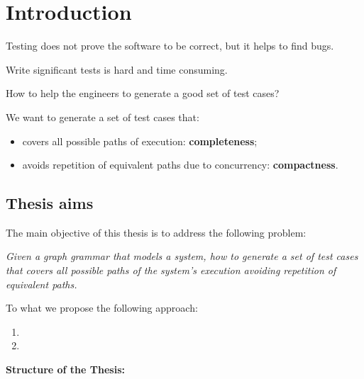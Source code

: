 \chapter{Introduction}

Testing does not prove the software to be correct, but it helps to find bugs.

Write significant tests is hard and time consuming.

How to help the engineers to generate a good set of test cases?

We want to generate a set of test cases that:

\begin{itemize}
  \item covers all possible paths of execution: \textbf{completeness};
  \item avoids repetition of equivalent paths due to concurrency: \textbf{compactness}.
\end{itemize}

\section{Thesis aims}

The main objective of this thesis is to address the following problem:

\begin{intuition}
  \textit{Given a graph grammar that models a system, how to generate a set of test cases that covers all possible paths of the system's execution avoiding repetition of equivalent paths.}
\end{intuition}

To what we propose the following approach:

\begin{enumerate}
  \item
  \item
\end{enumerate}

\hfill \break
\textbf{Structure of the Thesis:}

